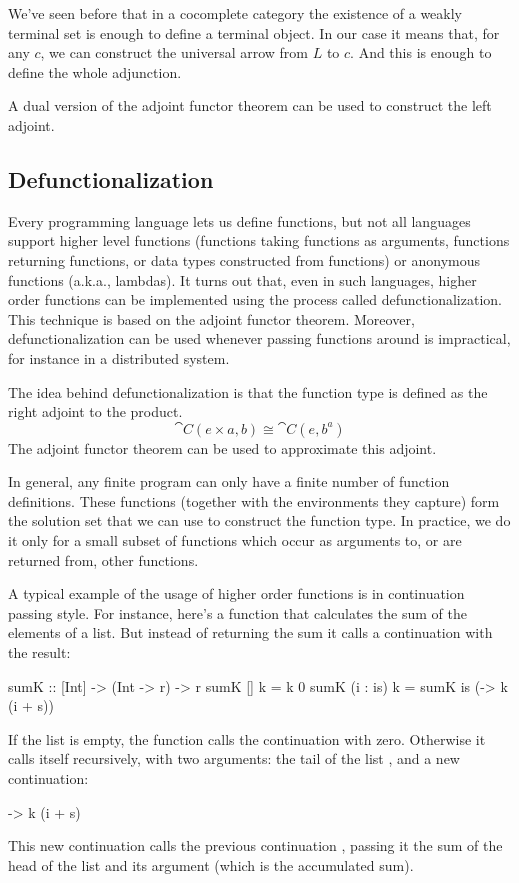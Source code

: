 \documentclass[DaoFP]{subfiles}
\begin{document}
We've seen before that in a cocomplete category the existence of a weakly terminal set is enough to define a terminal object. In our case it means that, for any $c$, we can construct the universal arrow from $L$ to $c$. And this is enough to define the whole adjunction.

A dual version of the adjoint functor theorem can be used to construct the left adjoint.

\subsection{Defunctionalization}

Every programming language lets us define functions, but not all languages support higher level functions (functions taking functions as arguments, functions returning functions, or data types constructed from functions) or anonymous functions (a.k.a., lambdas). It turns out that, even in such languages, higher order functions can be implemented using the process called defunctionalization. This technique is based on the adjoint functor theorem. Moreover, defunctionalization can be used whenever passing functions around is impractical, for instance in a distributed system.

The idea behind defunctionalization is that the function type is defined as the right adjoint to the product. 
\[ \cat C(e \times a, b) \cong \cat C(e, b^a) \]
The adjoint functor theorem can be used to approximate this adjoint. 

In general, any finite program can only have a finite number of function definitions. These functions (together with the environments they capture) form the solution set that we can use to construct the function type. In practice, we do it only for a small subset of functions which occur as arguments to, or are returned from, other functions.

A typical example of the usage of higher order functions is in continuation passing style. For instance, here's a function that calculates the sum of the elements of a list. But instead of returning the sum it calls a continuation  with the result:
\begin{haskell}
sumK :: [Int] -> (Int -> r) -> r
sumK [] k = k 0
sumK (i : is) k =
  sumK is (\s -> k (i + s))
\end{haskell}
If the list is empty, the function calls the continuation with zero. Otherwise it calls itself recursively, with two arguments: the tail of the list , and a new continuation:
\begin{haskell}
\s -> k (i + s)
\end{haskell}
This new continuation calls the previous continuation , passing it the sum of the head of the list and its argument  (which is the accumulated sum). 
\end{document}
